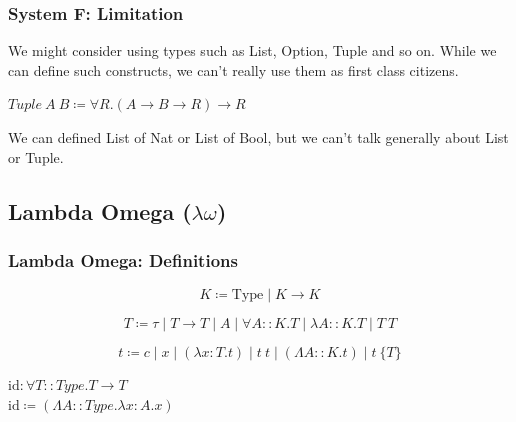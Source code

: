 \documentclass{beamer}
\newcommand{\type}{\text{Type}}
\begin{document}
\begin{frame}[fragile]
  \frametitle{System F: Limitation}

  We might consider using types such as List, Option, Tuple and so on.
  While we can define such constructs, we can't really use them as first class citizens.

  \vspace{5mm}

  $ Tuple\ A\ B \coloneqq \forall R. (A \rightarrow B \rightarrow R) \rightarrow R $ \\

  \vspace{5mm}

  We can defined List of Nat or List of Bool, but we can't talk generally about List or Tuple.

\end{frame}

\subsection{Lambda Omega ($\lambda \omega$)}

\begin{frame}[fragile]
  \frametitle{Lambda Omega: Definitions}

  $$ K \coloneqq \type \mid K \rightarrow K $$

  $$ T \coloneqq \tau \mid T \rightarrow T \mid A \mid \forall A :: K . T \mid \lambda A :: K . T \mid T\ T $$

  $$
    t \coloneqq c
      \mid x
      \mid (\lambda x : T . t)
      \mid t\ t
      \mid (\Lambda A :: K . t)
      \mid t\ \{T\}
  $$

  \vspace{5mm}

  $\text{id} : \forall T :: Type . T \rightarrow T$ \\
  $\text{id} \coloneqq (\Lambda A :: Type . \lambda x : A . x)$ \\
\end{frame}
\end{document}
